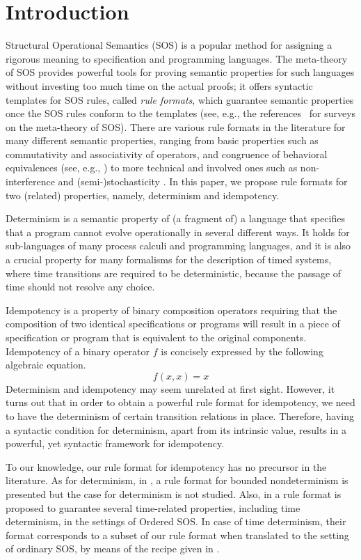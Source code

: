 \section{Introduction}
Structural Operational Semantics (SOS) \cite{Plotkin04a} is a popular method for assigning a rigorous meaning to
specification and programming languages.
The meta-theory of SOS provides powerful tools for proving semantic properties for such languages
without investing too much time on the actual proofs; it offers syntactic templates for SOS rules, called
\emph{rule formats},
which guarantee semantic properties once the SOS rules conform to the templates
(see, e.g., the references~\cite{Aceto01,Mousavi07-TCS} for surveys on the meta-theory of SOS).
There are various rule formats  in the literature for many different semantic properties, 
ranging from basic properties such as commutativity \cite{Mousavi05-IPL} and 
associativity \cite{Mousavi08-CONCUR} of operators, and congruence of behavioral 
equivalences (see, e.g., \cite{Verhoef95}) to more technical and involved ones such as 
non-interference \cite{Tini04} and (semi-)stochasticity \cite{Lanotte05}.
In this paper, we propose rule formats for two (related) properties, namely, determinism and idempotency.

Determinism is a semantic property of (a  fragment of) a language
that specifies that a program cannot evolve operationally in several different ways.
It holds for sub-languages of many process calculi and programming languages,
and it is also a crucial property for many formalisms for the description of timed systems, where time transitions are required to be deterministic, because the passage of time should not resolve any choice.

Idempotency is a property of binary composition operators requiring
that the composition of two identical specifications or programs
will result in a piece of specification or program that is equivalent to the original components.
Idempotency of a binary operator $f$ is concisely expressed by the following algebraic equation.
\[
f(x, x) = x
\]
Determinism and idempotency may seem unrelated at first sight.
However, it turns out that in order to obtain a powerful rule format
for idempotency, we need to have the determinism of certain transition relations in place. Therefore,
having a syntactic condition for determinism, apart from its intrinsic value,
results in a powerful, yet syntactic framework for idempotency.


To our knowledge, our rule format for idempotency has no precursor in the literature.
As for determinism, in \cite{Fokkink03a}, a rule format for bounded nondeterminism is presented but the case for determinism is not studied.
Also, in \cite{Ulidowski97b} a rule format is proposed to guarantee several time-related properties, including time determinism, in the settings of
Ordered SOS. In case of time determinism, their format corresponds to a subset of our rule format when translated to the setting of ordinary SOS, by means of the recipe given in \cite{Mousavi06-FSTTCS}.

